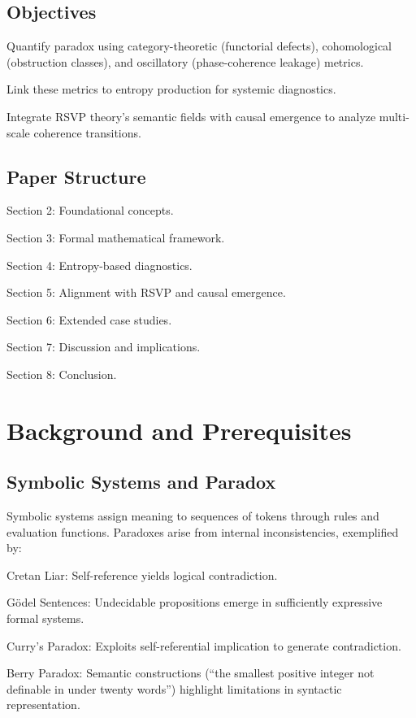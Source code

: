 \documentclass[12pt]{article}
\theoremstyle{plain}
\begin{document}
\subsection{Objectives}

Quantify paradox using category-theoretic (functorial defects), cohomological (obstruction classes), and oscillatory (phase-coherence leakage) metrics.

Link these metrics to entropy production for systemic diagnostics.

Integrate RSVP theory’s semantic fields with causal emergence to analyze multi-scale coherence transitions.

\subsection{Paper Structure}

Section 2: Foundational concepts.

Section 3: Formal mathematical framework.

Section 4: Entropy-based diagnostics.

Section 5: Alignment with RSVP and causal emergence.

Section 6: Extended case studies.

Section 7: Discussion and implications.

Section 8: Conclusion.

\section{Background and Prerequisites}

\subsection{Symbolic Systems and Paradox}

Symbolic systems assign meaning to sequences of tokens through rules and evaluation functions. Paradoxes arise from internal inconsistencies, exemplified by:

Cretan Liar: Self-reference yields logical contradiction.

Gödel Sentences: Undecidable propositions emerge in sufficiently expressive formal systems.

Curry’s Paradox: Exploits self-referential implication to generate contradiction.

Berry Paradox: Semantic constructions (“the smallest positive integer not definable in under twenty words”) highlight limitations in syntactic representation.
\end{document}
